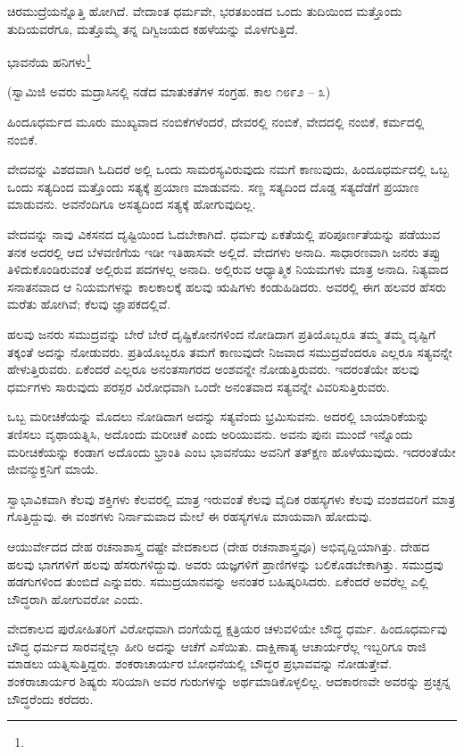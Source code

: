 ಚಿರಮುದ್ರೆಯನ್ನೊತ್ತಿ ಹೋಗಿದೆ. ವೇದಾಂತ ಧರ್ಮವೇ, ಭರತಖಂಡದ ಒಂದು ತುದಿಯಿಂದ ಮತ್ತೊಂದು ತುದಿಯವರೆಗೂ, ಮತ್ತೊಮ್ಮೆ ತನ್ನ ದಿಗ್ವಿಜಯದ ಕಹಳೆಯನ್ನು ಮೊಳಗುತ್ತಿದೆ.

ಭಾವನೆಯ ಹನಿಗಳು\protect\footnote{}

\begin{center}
(ಸ್ವಾಮಿಜಿ ಅವರು ಮದ್ರಾಸಿನಲ್ಲಿ ನಡೆದ ಮಾತುಕತೆಗಳ ಸಂಗ್ರಹ. ಕಾಲ ೧೮೯೨ – ೩)
\end{center}

ಹಿಂದೂಧರ್ಮದ ಮೂರು ಮುಖ್ಯವಾದ ನಂಬಿಕೆಗಳೆಂದರೆ, ದೇವರಲ್ಲಿ ನಂಬಿಕೆ, ವೇದದಲ್ಲಿ ನಂಬಿಕೆ, ಕರ್ಮದಲ್ಲಿ ನಂಬಿಕೆ.

ವೇದವನ್ನು ವಿಶದವಾಗಿ ಓದಿದರೆ ಅಲ್ಲಿ ಒಂದು ಸಾಮರಸ್ಯವಿರುವುದು ನಮಗೆ ಕಾಣುವುದು, ಹಿಂದೂಧರ್ಮದಲ್ಲಿ ಒಬ್ಬ ಒಂದು ಸತ್ಯದಿಂದ ಮತ್ತೊಂದು ಸತ್ಯಕ್ಕೆ ಪ್ರಯಾಣ ಮಾಡುವನು. ಸಣ್ಣ ಸತ್ಯದಿಂದ ದೊಡ್ಡ ಸತ್ಯದೆಡೆಗೆ ಪ್ರಯಾಣ ಮಾಡುವನು. ಅವನೆಂದಿಗೂ ಅಸತ್ಯದಿಂದ ಸತ್ಯಕ್ಕೆ ಹೋಗುವುದಿಲ್ಲ.

ವೇದವನ್ನು ನಾವು ವಿಕಸನದ ದೃಷ್ಟಿಯಿಂದ ಓದಬೇಕಾಗಿದೆ. ಧರ್ಮವು ಏಕತೆಯಲ್ಲಿ ಪರಿಪೂರ್ಣತೆಯನ್ನು ಪಡೆಯುವ ತನಕ ಅದರಲ್ಲಿ ಆದ ಬೆಳವಣಿಗೆಯ ಇಡೀ ಇತಿಹಾಸವೇ ಅಲ್ಲಿದೆ. ವೇದಗಳು ಅನಾದಿ. ಸಾಧಾರಣವಾಗಿ ಜನರು ತಪ್ಪು ತಿಳಿದುಕೊಂಡಿರುವಂತೆ ಅಲ್ಲಿರುವ ಪದಗಳಲ್ಲ ಅನಾದಿ. ಅಲ್ಲಿರುವ ಆಧ್ಯಾತ್ಮಿಕ ನಿಯಮಗಳು ಮಾತ್ರ ಅನಾದಿ. ನಿತ್ಯವಾದ ಸನಾತನವಾದ ಆ ನಿಯಮಗಳನ್ನು ಕಾಲಕಾಲಕ್ಕೆ ಹಲವು ಋಷಿಗಳು ಕಂಡುಹಿಡಿದರು. ಅವರಲ್ಲಿ ಈಗ ಹಲವರ ಹೆಸರು ಮರೆತು ಹೋಗಿವೆ; ಕೆಲವು ಜ್ಞಾಪಕದಲ್ಲಿವೆ.

ಹಲವು ಜನರು ಸಮುದ್ರವನ್ನು ಬೇರೆ ಬೇರೆ ದೃಷ್ಟಿಕೋನಗಳಿಂದ ನೋಡಿದಾಗ ಪ್ರತಿಯೊಬ್ಬರೂ ತಮ್ಮ ತಮ್ಮ ದೃಷ್ಟಿಗೆ ತಕ್ಕಂತೆ ಅದನ್ನು ನೋಡುವರು. ಪ್ರತಿಯೊಬ್ಬರೂ ತಮಗೆ ಕಾಣುವುದೇ ನಿಜವಾದ ಸಮುದ್ರವೆಂದರೂ ಎಲ್ಲರೂ ಸತ್ಯವನ್ನೇ ಹೇಳುತ್ತಿರುವರು. ಏಕೆಂದರೆ ಎಲ್ಲರೂ ಅನಂತಸಾಗರದ ಅಂಶವನ್ನೇ ನೋಡುತ್ತಿರುವರು. ಇದರಂತೆಯೇ ಹಲವು ಧರ್ಮಗಳು ಸಾರುವುದು ಪರಸ್ಪರ ವಿರೋಧವಾಗಿ ಒಂದೇ ಅನಂತವಾದ ಸತ್ಯವನ್ನೇ ವಿವರಿಸುತ್ತಿರುವರು.

ಒಬ್ಬ ಮರೀಚಿಕೆಯನ್ನು ಮೊದಲು ನೋಡಿದಾಗ ಅದನ್ನು ಸತ್ಯವೆಂದು ಭ್ರಮಿಸುವನು. ಅದರಲ್ಲಿ ಬಾಯಾರಿಕೆಯನ್ನು ತಣಿಸಲು ವೃಥಾಯತ್ನಿಸಿ, ಅದೊಂದು ಮರೀಚಿಕೆ ಎಂದು ಅರಿಯುವನು. ಅವನು ಪುನಃ ಮುಂದೆ ಇನ್ನೊಂದು ಮರೀಚಿಕೆಯನ್ನು ಕಂಡಾಗ ಅದೊಂದು ಭ್ರಾಂತಿ ಎಂಬ ಭಾವನೆಯು ಅವನಿಗೆ ತತ್‌ಕ್ಷಣ ಹೊಳೆಯುವುದು. ಇದರಂತೆಯೇ ಜೀವನ್ಮುಕ್ತನಿಗೆ ಮಾಯೆ.

ಸ್ವಾಭಾವಿಕವಾಗಿ ಕೆಲವು ಶಕ್ತಿಗಳು ಕೆಲವರಲ್ಲಿ ಮಾತ್ರ ಇರುವಂತೆ ಕೆಲವು ವೈದಿಕ ರಹಸ್ಯಗಳು ಕೆಲವು ವಂಶದವರಿಗೆ ಮಾತ್ರ ಗೊತ್ತಿದ್ದುವು. ಈ ವಂಶಗಳು ನಿರ್ನಾಮವಾದ ಮೇಲೆ ಈ ರಹಸ್ಯಗಳೂ ಮಾಯವಾಗಿ ಹೋದುವು.

ಆಯುರ್ವೇದದ ದೇಹ ರಚನಾಶಾಸ್ತ್ರ  ದಷ್ಟೇ ವೇದಕಾಲದ (ದೇಹ ರಚನಾಶಾಸ್ತ್ರವೂ) ಅಭಿವೃದ್ದಿಯಾಗಿತ್ತು. ದೇಹದ ಹಲವು ಭಾಗಗಳಿಗೆ ಹಲವು ಹೆಸರುಗಳಿದ್ದುವು. ಅವರು ಯಜ್ಞಗಳಿಗೆ ಪ್ರಾಣಿಗಳನ್ನು ಬಲಿಕೊಡಬೇಕಾಗಿತ್ತು. ಸಮುದ್ರವು ಹಡಗುಗಳಿಂದ ತುಂಬಿದೆ ಎನ್ನುವರು. ಸಮುದ್ರಯಾನವನ್ನು ಅನಂತರ ಬಹಿಷ್ಕರಿಸಿದರು. ಏಕೆಂದರೆ ಅವರೆಲ್ಲ ಎಲ್ಲಿ ಬೌದ್ಧರಾಗಿ ಹೋಗುವರೋ ಎಂದು.

ವೇದಕಾಲದ ಪುರೋಹಿತರಿಗೆ ವಿರೋಧವಾಗಿ ದಂಗೆಯೆದ್ದ ಕ್ಷತ್ರಿಯರ ಚಳುವಳಿಯೇ ಬೌದ್ಧ ಧರ್ಮ. ಹಿಂದೂಧರ್ಮವು ಬೌದ್ಧ ಧರ್ಮದ ಸಾರವನ್ನೆಲ್ಲಾ ಹೀರಿ ಅದನ್ನು ಆಚೆಗೆ ಎಸೆಯಿತು. ದಾಕ್ಷಿಣಾತ್ಯ ಆಚಾರ್ಯರೆಲ್ಲ ಇಬ್ಬರಿಗೂ ರಾಜಿ ಮಾಡಲು ಯತ್ನಿಸುತ್ತಿದ್ದರು. ಶಂಕರಾಚಾರ್ಯರ ಬೋಧನೆಯಲ್ಲಿ ಬೌದ್ಧರ ಪ್ರಭಾವವನ್ನು ನೋಡುತ್ತೇವೆ. ಶಂಕರಾಚಾರ್ಯರ ಶಿಷ್ಯರು ಸರಿಯಾಗಿ ಅವರ ಗುರುಗಳನ್ನು ಅರ್ಥಮಾಡಿಕೊಳ್ಳಲಿಲ್ಲ. ಆದಕಾರಣವೇ ಅವರನ್ನು ಪ್ರಚ್ಛನ್ನ ಬೌದ್ಧರೆಂದು ಕರೆದರು.

